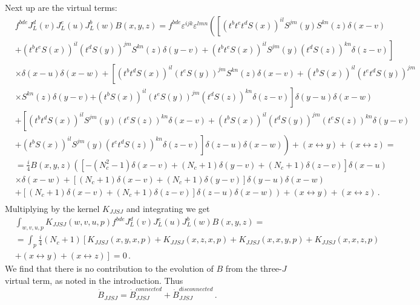 \documentclass[11pt,a4paper]{article}
\def\beq{\begin{equation}}
\def\eeq{\end{equation}}
\def\beq{\begin{equation}}
\def\eeq{\end{equation}}
\begin{document}
Next up are the virtual terms:
\begin{equation}\begin{split}
&f^{bde}J_{L}^{d}(v)J_{L}^{e}(u)J_{L}^{b}(w)B(x,y,z)=f^{bde}\varepsilon^{ijk}\varepsilon^{lmn}\left(\left[(t^{b}t^{e}t^{d}S(x))^{il}S^{jm}(y)S^{kn}(z)\delta(x-v)\right.\right.\\
&\left. +(t^{b}t^{e}S(x))^{il}(t^{d}S(y))^{jm}S^{kn}(z)\delta(y-v)+(t^{b}t^{e}S(x))^{il}S^{jm}(y)(t^{d}S(z))^{kn}\delta(z-v)\right]\\ 
&\times \delta(x-u)\delta(x-w)+
\left[(t^{b}t^{d}S(x))^{il}(t^{e}S(y))^{jm}S^{kn}(z)\delta(x-v)+(t^{b}S(x))^{il}(t^{e}t^{d}S(y))^{jm}\right. \\
&\times S^{kn}(z)\delta(y-v) \left.+(t^{b}S(x))^{il}(t^{e}S(y))^{jm}(t^{d}S(z))^{kn}\delta(z-v)\right]\delta(y-u)\delta(x-w)\\
&+\left[(t^{b}t^{d}S(x))^{il}S^{jm}(y)(t^{e}S(z))^{kn}\delta(x-v)+(t^{b}S(x))^{il}(t^{d}S(y))^{jm}(t^{e}S(z))^{kn}\delta(y-v)\right.\\
&\left.\left.+(t^{b}S(x))^{il}S^{jm}(y)(t^{e}t^{d}S(z))^{kn}\delta(z-v)\right]\delta(z-u)\delta(x-w)\right)+\left(x\leftrightarrow y\right)+\left(x\leftrightarrow z\right)=\\
&=\frac{i}{4}B(x,y,z)\left(\left[-(N_{c}^{2}-1)\delta(x-v)+(N_{c}+1)\delta(y-v)+(N_{c}+1)\delta(z-v)\right]\delta(x-u)\right. \\
&\times \delta(x-w)
+\left[(N_{c}+1)\delta(x-v)+(N_{c}+1)\delta(y-v)\right]\delta(y-u)\delta(x-w)\\
&+\left.\left[(N_{c}+1)\delta(x-v)+(N_{c}+1)\delta(z-v)\right]\delta(z-u)\delta(x-w)\right)+\left(x\leftrightarrow y\right)+\left(x\leftrightarrow z\right)\,.\\
\end{split}\end{equation}
Multiplying by the kernel $K_{JJSJ}$ and integrating we get
\begin{equation}\begin{split}
&\int_{w,v,u,p}K_{JJSJ}(w,v,u,p)f^{bde}J_{L}^{d}(v)J_{L}^{e}(u)J_{L}^{b}(w)B(x,y,z)=\\
&=\int_{p}\frac{i}{4}(N_{c}+1)\left[K_{JJSJ}(x,y,x,p)+K_{JJSJ}(x,z,x,p)+K_{JJSJ}(x,x,y,p)+K_{JJSJ}(x,x,z,p)\right.\\
&\left.+\left(x\leftrightarrow y\right)+\left(x\leftrightarrow z\right)\right]=0\,.
\end{split}\end{equation}
We find that there is no contribution to the evolution of $B$ from the three-$J$ virtual term, as noted in the introduction.
Thus
\beq
\dot B_{JJSJ}=\dot B_{JJSJ}^{connected}+\dot B_{JJSJ}^{disconnected}\,.
\eeq
\end{document}
